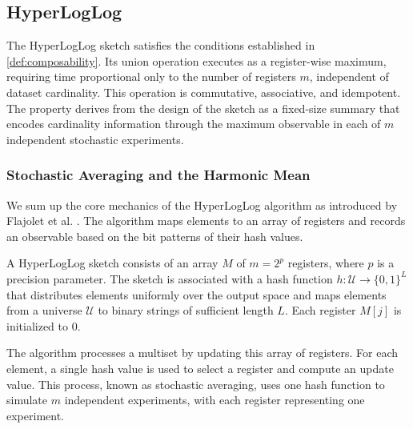 
\subsection{HyperLogLog} \label{subsec:hyperloglog}

The HyperLogLog sketch satisfies the conditions  established in \ref{def:composability}. Its union operation executes as a register-wise maximum, requiring time proportional only to the number of registers $m$, independent of dataset cardinality. This operation is commutative, associative, and idempotent. The property derives from the design of the sketch as a fixed-size summary that encodes cardinality information through the maximum observable in each of $m$ independent stochastic experiments.

\subsubsection{Stochastic Averaging and the Harmonic Mean}

We sum up the core mechanics of the HyperLogLog algorithm as introduced by Flajolet et al. \cite{Flajolet2007HyperLogLogTA}. The algorithm maps elements to an array of registers and records an observable based on the bit patterns of their hash values.

\begin{definition} \label{def:hll-sketch}
    A HyperLogLog sketch consists of an array $M$ of $m=2^p$ registers, where $p$ is a precision parameter. The sketch is associated with a hash function $h: \mathcal{U} \to \{0,1\}^L$ that distributes elements uniformly over the output space and maps elements from a universe $\mathcal{U}$ to binary strings of sufficient length $L$. Each register $M[j]$ is initialized to 0.
\end{definition}

The algorithm processes a multiset by updating this array of registers. For each element, a single hash value is used to select a register and compute an update value. This process, known as stochastic averaging, uses one hash function to simulate $m$ independent experiments, with each register representing one experiment.

